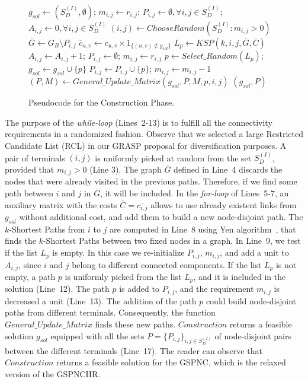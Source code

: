 \documentclass{llncs}
\begin{document}
\begin{figure}[H]
\begin{algorithm}[H]
\caption{$(sol,P) = Construction(G_B,C,R,k)$}
\begin{algorithmic}[1]
\STATE $g_{sol} \leftarrow (S_D^{(I)},\emptyset)$; $m_{i,j}\leftarrow r_{i,j}$; $P_{i,j}\leftarrow \emptyset, \forall i,j \in S_{D}^{(I)}$; $A_{i,j}\leftarrow 0, \forall i,j \in S_{D}^{(I)}$
\STATE $(i,j) \leftarrow ChooseRandom(S_{D}^{(I)}: m_{i,j}>0)$
\STATE $\overline{G} \leftarrow G_B \setminus P_{i,j}$
\STATE $\overline{c}_{u,v} \leftarrow c_{u,v} \times 1_{\{(u,v) \notin g_{sol}\}}$
\ENDFOR
\STATE $L_p \leftarrow KSP(k,i,j,\overline{G},\overline{C})$
\STATE $A_{i,j} \leftarrow A_{i,j}+1$; $P_{i,j} \leftarrow \emptyset$; $m_{i,j}\leftarrow r_{i,j}$ 
\ELSE 
\STATE $p \leftarrow Select\_Random(L_p)$; $g_{sol} \leftarrow g_{sol} \cup \{p\}$
\STATE $P_{i,j} \leftarrow P_{i,j} \cup \{p\}$; $m_{i,j} \leftarrow m_{i,j}-1$
\STATE $(P,M) \leftarrow General\_Update\_Matrix(g_{sol},P,M,p,i,j)$
\ENDIF
\ENDWHILE
\RETURN $(g_{sol},P)$
\end{algorithmic}
\end{algorithm}
\caption{Pseudocode for the Construction Phase. \label{const}}
\end{figure}

The purpose of the \textit{while-loop} (Lines~2-13) is to fulfill all the connectivity 
requirements in a randomized fashion. Observe that we selected a large Restricted Candidate List (RCL) in 
our GRASP proposal for diversification purposes. 
A pair of terminals $(i,j)$ is uniformly picked at random from the set $S_{D}^{(I)}$, provided 
that $m_{i,j}>0$ (Line 3). The graph $\overline{G}$ defined in Line~4 discards the nodes 
that were already visited in the previous paths. Therefore, if we find some path between $i$ and 
$j$ in $\overline{G}$, it will be included. In the \textit{for-loop} of Lines~5-7, an auxiliary matrix with the costs $\overline{C}=\overline{c_{i,j}}$ allows to use already existent links from $g_{sol}$ without additional cost, and add them to build a new node-disjoint path. The $k$-Shortest Paths from $i$ to $j$ are computed in Line~8 using Yen algorithm~\cite{14}, that finds the $k$-Shortest Paths between two fixed nodes in a graph. In Line~9, we test if the list $L_p$ is empty. In this case we re-initialize $P_{i,j}$, $m_{i,j}$, and add a unit to $A_{i,j}$, since $i$ and $j$ belong to different connected components. If the list $L_p$ is not empty, a path $p$ is uniformly picked from the list $L_p$, 
and it is included in the solution (Line~12). The path $p$ is added to $P_{i,j}$, and the 
requirement $m_{i,j}$ is decreased a unit (Line~13). The addition of the path $p$ could 
build node-disjoint paths from different terminals. Consequently, the function $General\_Update\_Matrix$ finds these new paths. $Construction$ returns a feasible solution $g_{sol}$ equipped with all the 
sets $P=\{P_{i,j}\}_{i,j \in S_{D}^{(I)}}$ of node-disjoint pairs between the different terminals 
(Line~17). The reader can observe that $Construction$ returns a feasible solution for the GSPNC, which is the 
relaxed version of the GSPNCHR. 
\end{document}
